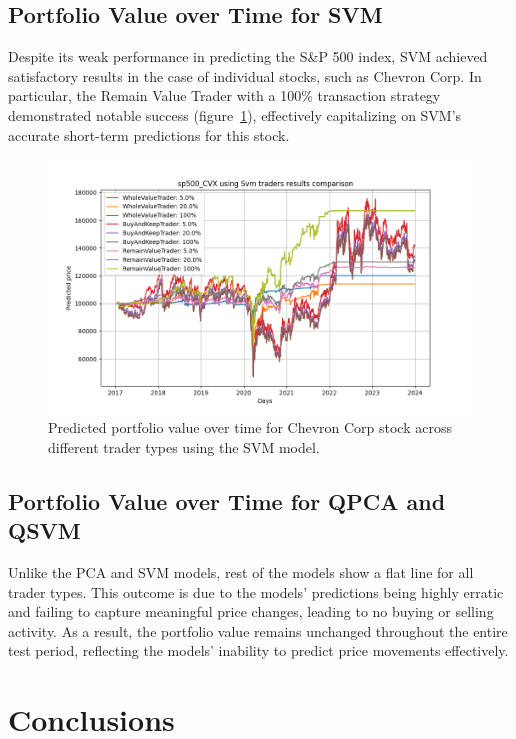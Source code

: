 \documentclass[journal]{IEEEtran}
\begin{document}
\subsection{Portfolio Value over Time for SVM}

Despite its weak performance in predicting the S\&P 500 index, SVM achieved satisfactory results in the case of individual stocks, such as Chevron Corp. In particular, the Remain Value Trader with a 100\% transaction strategy demonstrated notable success (figure~\ref{fig:cvx_svm_traders}), effectively capitalizing on SVM's accurate short-term predictions for this stock.

\begin{figure}[ht!]
    \centering
    \includegraphics[width=\linewidth]{cvx_svm_traders.png}
    \caption{Predicted portfolio value over time for Chevron Corp stock across different trader types using the SVM model.}
    \label{fig:cvx_svm_traders}
\end{figure}

\subsection{Portfolio Value over Time for QPCA and QSVM}

Unlike the PCA and SVM models, rest of the models show a flat line for all trader types. This outcome is due to the models' predictions being highly erratic and failing to capture meaningful price changes, leading to no buying or selling activity. As a result, the portfolio value remains unchanged throughout the entire test period, reflecting the models' inability to predict price movements effectively.

\section{Conclusions}
\end{document}
